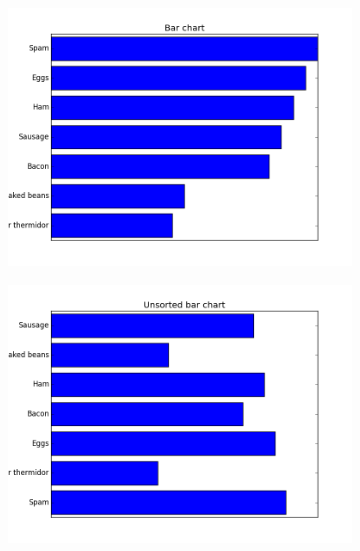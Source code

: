 \begin{figure}[h]
\centering
\begin{subfigure}{.45\textwidth}
\centering
\includegraphics[width=\textwidth]{bar_chart_horizontal_sorted.png}
\end{subfigure}
\begin{subfigure}{.45\textwidth}
\centering
\includegraphics[width=\textwidth]{bar_chart_unsorted.png}
\end{subfigure}
\begin{subfigure}{.45\textwidth}
\centering

\end{subfigure}
\end{figure}
